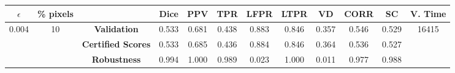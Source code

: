\begin{longtable}{ c  c | c | c  c  c  c  c  c  c c c}
\toprule \textbf{$\epsilon$} & \textbf{\% pixels} & & \textbf{Dice} & \textbf{PPV} & \textbf{TPR} & \textbf{LFPR} & \textbf{LTPR} & \textbf{VD} & \textbf{CORR} & \textbf{SC} & \textbf{V. Time} \\
\midrule 
\multirow{3}{*}{0.004}  & \multirow{3}{*}{10} &\textbf{Validation} & 0.533 & 0.681 & 0.438 & 0.883 & 0.846 & 0.357 & 0.546 & 0.529 & \multirow{3}{*}{16415} \\
 & & \textbf{Certified Scores} & 0.533 & 0.685 & 0.436 & 0.884 & 0.846 & 0.364 & 0.536 & 0.527 & \\
& & \textbf{Robustness} & 0.994 & 1.000 & 0.989 & 0.023 & 1.000 & 0.011 & 0.977 & 0.988 & \\
\end{longtable}